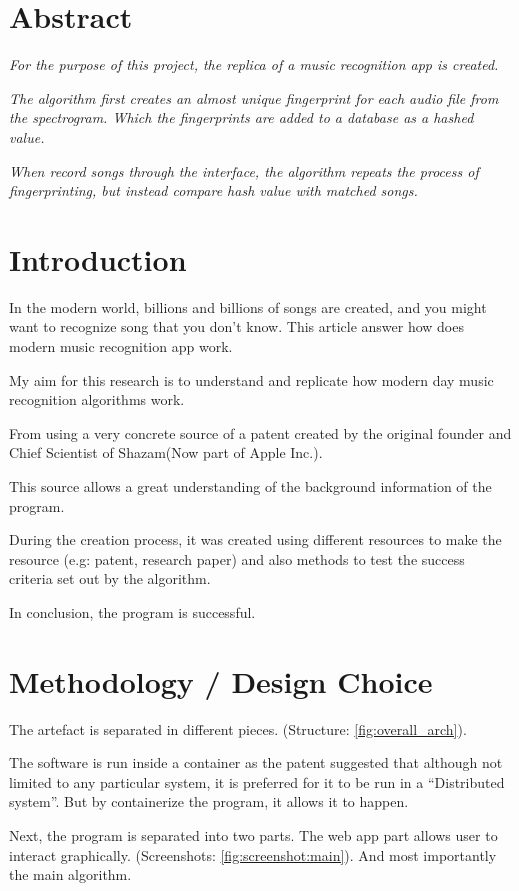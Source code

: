 \chapter*{Abstract}
\textit{For the purpose of this project, the replica of a music recognition app is created.}

\textit{The algorithm first creates an almost unique fingerprint for each audio file from the spectrogram. Which the fingerprints are added to a database as a hashed value.}

\textit{When record songs through the interface, the algorithm repeats the process of fingerprinting, but instead compare hash value with matched songs.}
\chapter{Introduction}

In the modern world, billions and billions of songs are created, and you might want to recognize song that you don't know. This article answer how does modern music recognition app work.

My aim for this research is to understand and replicate how modern day music recognition algorithms work. 

From using a very concrete source of a patent created by the original founder and Chief Scientist of Shazam\trademark (Now part of Apple Inc\trademark.)\cite{newnham_interview_2023}.

This source allows a great understanding of the background information of the program. 

During the creation process, it was created using different resources to make the resource (e.g: patent, research paper) and also methods to test the success criteria set out by the algorithm. 

In conclusion, the program is successful.
\chapter{Methodology / Design Choice}
The artefact is separated in different pieces. (Structure: \autoref{fig:overall_arch}).

The software is run inside a container as the patent suggested that although not limited to any particular system, it is preferred for it to be run in a “Distributed system”. But by containerize the program, it allows it to happen.

Next, the program is separated into two parts. The web app part allows user to interact graphically. (Screenshots: \autoref{fig:screenshot:main}). And most importantly the main algorithm.


